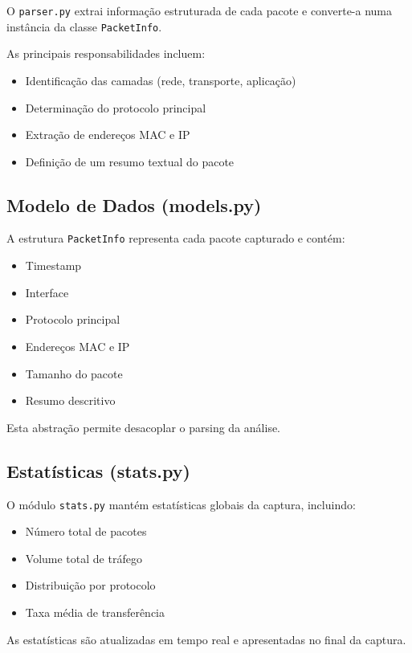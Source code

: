 \documentclass[a4paper,12pt]{article}
\begin{document}
O \texttt{parser.py} extrai informação estruturada de cada pacote e converte-a numa instância da classe \texttt{PacketInfo}.

As principais responsabilidades incluem:

\begin{itemize}
    \item Identificação das camadas (rede, transporte, aplicação)
    \item Determinação do protocolo principal
    \item Extração de endereços MAC e IP
    \item Definição de um resumo textual do pacote
\end{itemize}

\subsection{Modelo de Dados (models.py)}

A estrutura \texttt{PacketInfo} representa cada pacote capturado e contém:

\begin{itemize}
    \item Timestamp
    \item Interface
    \item Protocolo principal
    \item Endereços MAC e IP
    \item Tamanho do pacote
    \item Resumo descritivo
\end{itemize}

Esta abstração permite desacoplar o parsing da análise.

\subsection{Estatísticas (stats.py)}

O módulo \texttt{stats.py} mantém estatísticas globais da captura, incluindo:

\begin{itemize}
    \item Número total de pacotes
    \item Volume total de tráfego
    \item Distribuição por protocolo
    \item Taxa média de transferência
\end{itemize}

As estatísticas são atualizadas em tempo real e apresentadas no final da captura.
\end{document}
